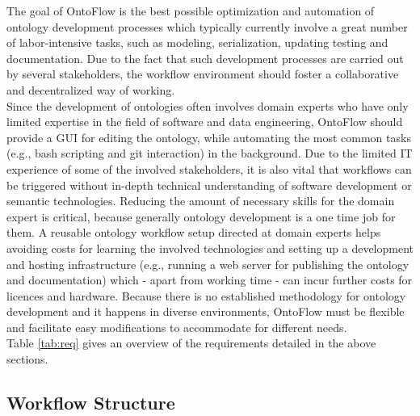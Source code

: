 \documentclass[sigconf]{acmart}
\begin{document}
The goal of OntoFlow is the best possible optimization and automation of ontology development processes which typically currently involve a great number of labor-intensive tasks, such as modeling, serialization, updating testing and documentation. Due to the fact that such development processes are carried out by several stakeholders, the workflow environment should foster a collaborative and decentralized way of working.\\
Since the development of ontologies often involves domain experts who have only limited expertise in the field of software and data engineering, OntoFlow should provide a GUI for editing the ontology, while automating the most common tasks (e.g., bash scripting and git interaction) in the background. Due to the limited IT experience of some of the involved stakeholders, it is also vital that workflows can be triggered without in-depth technical understanding of software development or semantic technologies. Reducing the amount of necessary skills for the domain expert is critical, because generally ontology development is a one time job for them. A reusable ontology workflow setup directed at domain experts helps avoiding costs for learning the involved technologies and setting up a development and hosting infrastructure (e.g., running a web server for publishing the ontology and documentation) which - apart from working time - can incur further costs for licences and hardware. Because there is no established methodology for ontology development and it happens in diverse environments, OntoFlow must be flexible and facilitate easy modifications to accommodate for different needs.\\
Table \ref{tab:req} gives an overview of the requirements detailed in the above sections.

  
\subsection{Workflow Structure}
\end{document}
